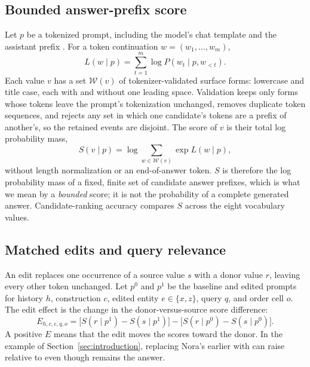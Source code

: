 \subsection{Bounded answer-prefix score}
\label{sec:score}

Let $p$ be a tokenized prompt, including the model's chat template and the assistant prefix . For a token continuation $w=(w_1,\ldots,w_m)$,
\begin{equation}
L(w\mid p)=\sum_{t=1}^{m}\log P(w_t\mid p,w_{<t}).
\end{equation}
Each value $v$ has a set $\mathcal{W}(v)$ of tokenizer-validated surface forms: lowercase and title case, each with and without one leading space. Validation keeps only forms whose tokens leave the prompt's tokenization unchanged, removes duplicate token sequences, and rejects any set in which one candidate's tokens are a prefix of another's, so the retained events are disjoint. The score of $v$ is their total log probability mass,
\begin{equation}
S(v\mid p)=\log\sum_{w\in\mathcal{W}(v)}\exp L(w\mid p),
\end{equation}
without length normalization or an end-of-answer token. $S$ is therefore the log probability mass of a fixed, finite set of candidate answer prefixes, which is what we mean by a \emph{bounded} score; it is not the probability of a complete generated answer. Candidate-ranking accuracy compares $S$ across the eight vocabulary values.

\subsection{Matched edits and query relevance}
\label{sec:edits}

An edit replaces one occurrence of a source value $s$ with a donor value $r$, leaving every other token unchanged. Let $p^0$ and $p^1$ be the baseline and edited prompts for history $h$, construction $c$, edited entity $e\in\{x,z\}$, query $q$, and order cell $o$. The edit effect is the change in the donor-versus-source score difference:
\begin{equation}
E_{h,c,e,q,o}=
\big[S(r\mid p^1)-S(s\mid p^1)\big]
-\big[S(r\mid p^0)-S(s\mid p^0)\big].
\end{equation}
A positive $E$ means that the edit moves the scores toward the donor. In the example of Section~\ref{sec:introduction}, replacing Nora's earlier  with  can raise  relative to  even though  remains the answer.

